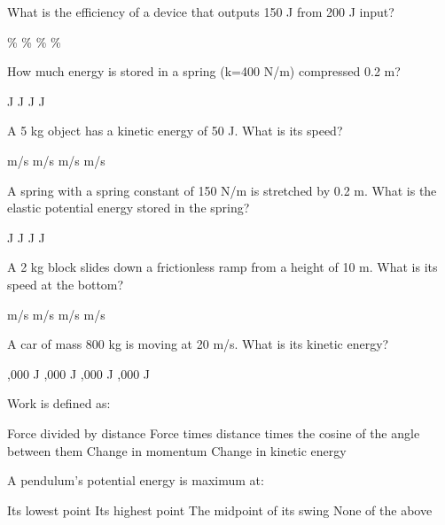 \documentclass[addpoints]{exam}
\begin{document}
\begin{questions}
\question[1] What is the efficiency of a device that outputs 150 J from 200 J input?
\begin{choices}
    \%
    \%
    \%
    \%
\end{choices}
\vspace{8mm}

\question[1] How much energy is stored in a spring (k=400 N/m) compressed 0.2 m?
\begin{choices}
     J
     J
     J
     J
\end{choices}
\vspace{8mm}


\question[1] A 5 kg object has a kinetic energy of 50 J. What is its speed?
\begin{choices}
     m/s
     m/s
     m/s
     m/s
\end{choices}


\question[1] A spring with a spring constant of 150 N/m is stretched by 0.2 m. What is the elastic potential energy stored in the spring?
\begin{choices}
     J
     J
     J
     J
\end{choices}

\question[1] A 2 kg block slides down a frictionless ramp from a height of 10 m. What is its speed at the bottom?
\begin{choices}
     m/s
     m/s
     m/s
     m/s
\end{choices}

\question[1] A car of mass 800 kg is moving at 20 m/s. What is its kinetic energy?
\begin{choices}
    ,000 J
    ,000 J
    ,000 J
    ,000 J
\end{choices}

\question[1] Work is defined as:
\begin{choices}
    \choice Force divided by distance
    \correctchoice Force times distance times the cosine of the angle between them
    \choice Change in momentum
    \choice Change in kinetic energy
\end{choices}


\question[1] A pendulum's potential energy is maximum at:
\begin{choices}
    \choice Its lowest point
    \correctchoice Its highest point
    \choice The midpoint of its swing
    \choice None of the above
\end{choices}



\end{questions}
\end{document}
